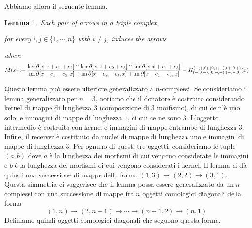 \documentclass[a4paper]{article}
\DeclareMathOperator{\im}{im}
\newtheorem{lemma}[theorem]{Lemma}
\begin{document}
Abbiamo allora il seguente lemma.

\begin{lemma}
    Each pair of arrows in a triple complex
    \begin{center}
    \end{center}
    for every \(i,j \in \{1, \cdots, n\}\) with \(i \neq j\),
    induces the arrows
    \begin{center}
    \end{center}
    where \[
        M(x) := \frac{
            \ker \partial[x, x + e_1 + e_2]
            \intersection
            \ker \partial[x, x + e_2 + e_3]
            \intersection
            \ker \partial[x, x + e_1 + e_3]
        }{
            \im \partial[x - e_1 - e_2, x]
            +
            \im \partial[x - e_2 - e_3, x]
            +
            \im \partial[x - e_1 - e_3, x]
        }
        = H_{(-,0,-), (0,-,-), (-,-,0)}^{(+,+,0), (0,+,+), (+,0,+)}(x)
    \]
\end{lemma}

Questo lemma può essere ulteriore generalizzato a \(n\)-complessi.
Se consideriamo il lemma generalizzato per \(n=3\), notiamo che il
donatore è costruito considerando kernel di mappe di lunghezza \(3\) (composizione di \(3\) morfismo),
di cui ce n'è uno solo, e immagini di mappe di lunghezza \(1\), ci cui ce ne sono \(3\).
L'oggetto intermedio è costruito con kernel e immagini di mappe entrambe di lunghezza 3.
Infine, il receiver è costituito da nuclei di mappe di lunghezza uno e immagini di mappe di lunghezza \(3\).
Per ognuno di questi tre oggetti, consideriamo le tuple \((a,b)\) dove \(a\) è la lunghezza
dei morfismi di cui vengono considerate le immagini e \(b\) è la lunghezza dei morfismi di cui vengono considerati i kernel.
Il lemma ci dà quindi una successione di mappe della forma \((1,3) \to (2,2) \to (3,1)\).
Questa simmetria ci suggerisce che il lemma possa essere generalizzato da un \(n\) complessi
con una successione di mappe fra \(n\) oggetti comologici diagonali della forma
\[
    (1,n) \to (2, n-1) \to \cdots \to (n-1, 2) \to (n,1)
\]
Definiamo quindi oggetti comologici diagonali che seguono questa forma.
\end{document}
